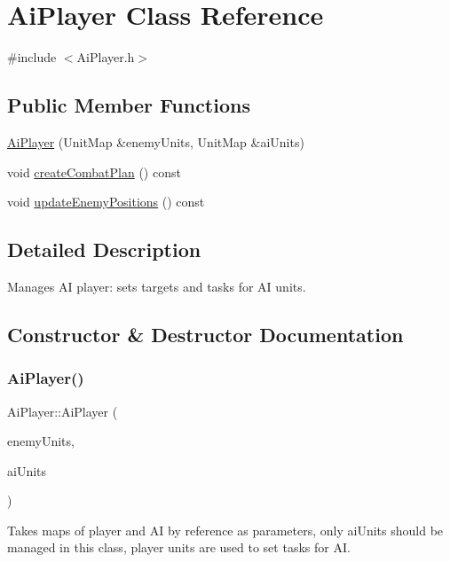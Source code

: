\hypertarget{class_ai_player}{}\section{Ai\+Player Class Reference}
\label{class_ai_player}


{\ttfamily \#include $<$Ai\+Player.\+h$>$}

\subsection*{Public Member Functions}
\begin{DoxyCompactItemize}
\item 
\hyperlink{class_ai_player_a052aeba5fe2de8b30ccee019807bb89a}{Ai\+Player} (Unit\+Map \&enemy\+Units, Unit\+Map \&ai\+Units)
\item 
void \hyperlink{class_ai_player_a013d269c314ff5a9158e51ec92633b3c}{create\+Combat\+Plan} () const
\item 
void \hyperlink{class_ai_player_aa134aabc87dfad1324823c357430ddec}{update\+Enemy\+Positions} () const
\end{DoxyCompactItemize}


\subsection{Detailed Description}
Manages AI player\+: sets targets and tasks for AI units. 

\subsection{Constructor \& Destructor Documentation}
\mbox{\label{class_ai_player_a052aeba5fe2de8b30ccee019807bb89a}} 
\subsubsection{\texorpdfstring{Ai\+Player()}{AiPlayer()}}
{\footnotesize\ttfamily Ai\+Player\+::\+Ai\+Player (\begin{DoxyParamCaption}\item[{Unit\+Map \&}]{enemy\+Units,  }\item[{Unit\+Map \&}]{ai\+Units }\end{DoxyParamCaption})}

Takes maps of player and AI by reference as parameters, only ai\+Units should be managed in this class, player units are used to set tasks for AI. 

